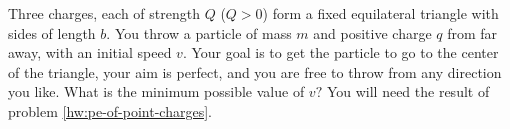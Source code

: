 Three charges, each of strength $Q$ ($Q>0$) form a fixed
equilateral triangle with sides of length $b$. You throw a
particle of mass $m$ and positive charge $q$ from far away,
with an initial speed $v$. Your goal is to get the particle
to go to the center of the triangle, your aim is perfect,
and you are free to throw from any direction you like. What
is the minimum possible value of $v?$
You will need the result of problem \ref{hw:pe-of-point-charges}.
\answercheck
